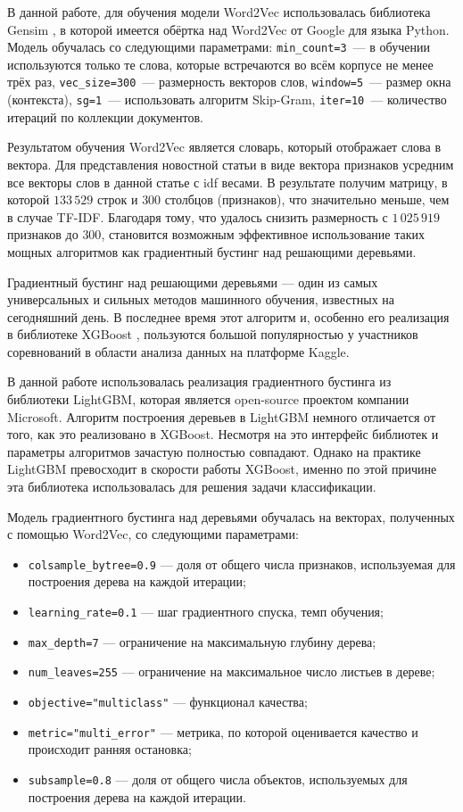\documentclass[a4paper, 14pt]{extarticle}
\begin{document}
В данной работе, для обучения модели Word2Vec использовалась библиотека Gensim \cite{rehurek_lrec}, в которой имеется обёртка над 
Word2Vec от Google  для языка Python. Модель обучалась со следующими параметрами: \verb|min_count=3|~--- в 
обучении используются только те слова,  которые встречаются во всём корпусе не менее трёх раз, \verb|vec_size=300|~--- размерность 
векторов слов, \verb|window=5|~--- размер окна (контекста), \verb|sg=1|~--- использовать алгоритм Skip-Gram, \verb|iter=10|~--- 
количество итераций по коллекции документов.

Результатом обучения Word2Vec является словарь, который отображает слова в вектора. Для представления новостной статьи в виде 
вектора признаков усредним все векторы слов в данной статье с idf весами. В результате получим матрицу, в которой $133\,529$ строк 
и $300$ столбцов (признаков), что значительно меньше, чем в случае TF-IDF. Благодаря тому, что удалось снизить размерность с 
$1\,025\,919$ признаков до $300$, становится возможным эффективное использование таких мощных алгоритмов как градиентный бустинг 
над решающими деревьями.

Градиентный бустинг над решающими деревьями --- один из самых универсальных и сильных методов машинного обучения, известных
на сегодняшний день. В последнее время этот алгоритм и, особенно его реализация в библиотеке XGBoost 
\cite{DBLP:journals/corr/ChenG16}, пользуются большой популярностью у участников соревнований в области анализа данных на платформе 
Kaggle.

В данной работе использовалась реализация градиентного бустинга из библиотеки LightGBM, которая является open-source проектом компании
Microsoft. Алгоритм построения деревьев в LightGBM немного отличается от того, как это реализовано в XGBoost. Несмотря на это интерфейс библиотек
и параметры алгоритмов зачастую полностью совпадают. Однако на практике LightGBM превосходит в скорости работы XGBoost, именно по этой причине
эта библиотека использовалась для решения задачи классификации.

Модель градиентного бустинга над деревьями обучалась на векторах, полученных с помощью Word2Vec, со следующими параметрами:
\begin{itemize}
	\item \verb|colsample_bytree=0.9| --- доля от общего числа признаков, используемая для построения дерева на каждой итерации;
	\item \verb|learning_rate=0.1| --- шаг градиентного спуска, темп обучения;
	\item \verb|max_depth=7| --- ограничение на максимальную глубину дерева;
	\item \verb|num_leaves=255| --- ограничение на максимальное число листьев в дереве;
	\item \verb|objective="multiclass"| --- функционал качества;
	\item \verb|metric="multi_error"| --- метрика, по которой оценивается качество и происходит ранняя остановка;
	\item \verb|subsample=0.8| --- доля от общего числа объектов, используемых для построения дерева на каждой итерации.
\end{itemize}
\end{document}
